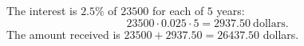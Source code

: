 The interest is $2.5\%$ of $23500$ for each of $5$ years:
\[23500\cdot0.025\cdot5=2937.50\ \text{dollars}.\]
The amount received is $23500+2937.50=\boxed{26437.50}$ dollars.
